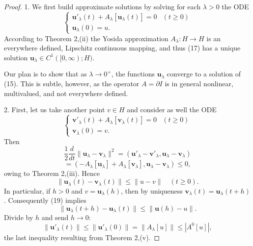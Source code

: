 \begin{proof}
1. We first build approximate solutions by solving for each $\lambda > 0$ the ODE
\[
\begin{cases} \mathbf{u}'_\lambda(t) + A_\lambda[\mathbf{u}_\lambda(t)] = 0 & (t \ge 0) \\ \mathbf{u}_\lambda(0) = u. \end{cases}
\tag{17}
\]
According to Theorem 2,(ii) the Yosida approximation $A_\lambda : H \to H$ is an everywhere defined, Lipschitz continuous mapping, and thus (17) has a unique solution $\mathbf{u}_\lambda \in C^1([0,\infty); H)$.

Our plan is to show that as $\lambda \to 0^+$, the functions $\mathbf{u}_\lambda$ converge to a solution of (15). This is subtle, however, as the operator $A = \partial I$ is in general nonlinear, multivalued, and not everywhere defined.

2. First, let us take another point $v \in H$ and consider as well the ODE
\[
\begin{cases} \mathbf{v}'_\lambda(t) + A_\lambda[\mathbf{v}_\lambda(t)] = 0 & (t \ge 0) \\ \mathbf{v}_\lambda(0) = v. \end{cases}
\tag{18}
\]
Then
\[
\frac{1}{2}\frac{d}{dt}\|\mathbf{u}_\lambda - \mathbf{v}_\lambda\|^2 = (\mathbf{u}'_\lambda - \mathbf{v}'_\lambda, \mathbf{u}_\lambda - \mathbf{v}_\lambda)
\]
\[
= (-A_\lambda[\mathbf{u}_\lambda] + A_\lambda[\mathbf{v}_\lambda], \mathbf{u}_\lambda - \mathbf{v}_\lambda) \le 0,
\]
owing to Theorem 2,(iii). Hence
\[
\|\mathbf{u}_\lambda(t) - \mathbf{v}_\lambda(t)\| \le \|u - v\| \quad (t \ge 0).
\tag{19}
\]
In particular, if $h > 0$ and $v = \mathbf{u}_\lambda(h)$, then by uniqueness $\mathbf{v}_\lambda(t) = \mathbf{u}_\lambda(t+h)$. Consequently (19) implies
\[
\|\mathbf{u}_\lambda(t+h) - \mathbf{u}_\lambda(t)\| \le \|\mathbf{u}(h) - u\|.
\]
Divide by $h$ and send $h \to 0$:
\[
\|\mathbf{u}'_\lambda(t)\| \le \|\mathbf{u}'_\lambda(0)\| = \|A_\lambda[u]\| \le |A^0[u]|,
\tag{20}
\]
the last inequality resulting from Theorem 2,(v).


\end{proof}
